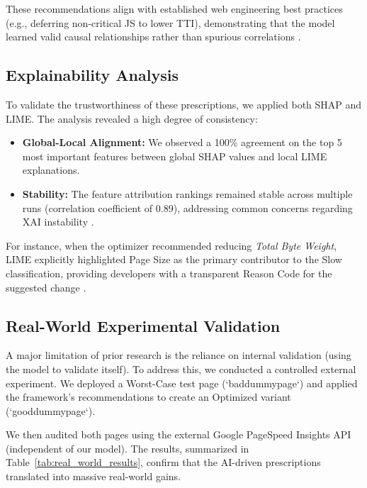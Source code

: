 \documentclass[sn-nature]{sn-jnl}
\begin{document}
These recommendations align with established web engineering best practices (e.g., deferring non-critical JS to lower TTI), demonstrating that the model learned valid causal relationships rather than spurious correlations \cite{notz2024, surianarayanan2023}.

\subsection{Explainability Analysis}

To validate the trustworthiness of these prescriptions, we applied both SHAP and LIME. The analysis revealed a high degree of consistency:
\begin{itemize}
    \item \textbf{Global-Local Alignment:} We observed a 100\% agreement on the top 5 most important features between global SHAP values and local LIME explanations.
    \item \textbf{Stability:} The feature attribution rankings remained stable across multiple runs (correlation coefficient of 0.89), addressing common concerns regarding XAI instability \cite{goldwasser2024}.
\end{itemize}

For instance, when the optimizer recommended reducing \textit{Total Byte Weight}, LIME explicitly highlighted Page Size as the primary contributor to the Slow classification, providing developers with a transparent Reason Code for the suggested change \cite{hassija2024}.

\subsection{Real-World Experimental Validation}

A major limitation of prior research is the reliance on internal validation (using the model to validate itself). To address this, we conducted a controlled external experiment. We deployed a Worst-Case test page (`baddummypage`) and applied the framework's recommendations to create an Optimized variant (`gooddummypage`).

We then audited both pages using the external Google PageSpeed Insights API (independent of our model). The results, summarized in Table~\ref{tab:real_world_results}, confirm that the AI-driven prescriptions translated into massive real-world gains.
\end{document}
